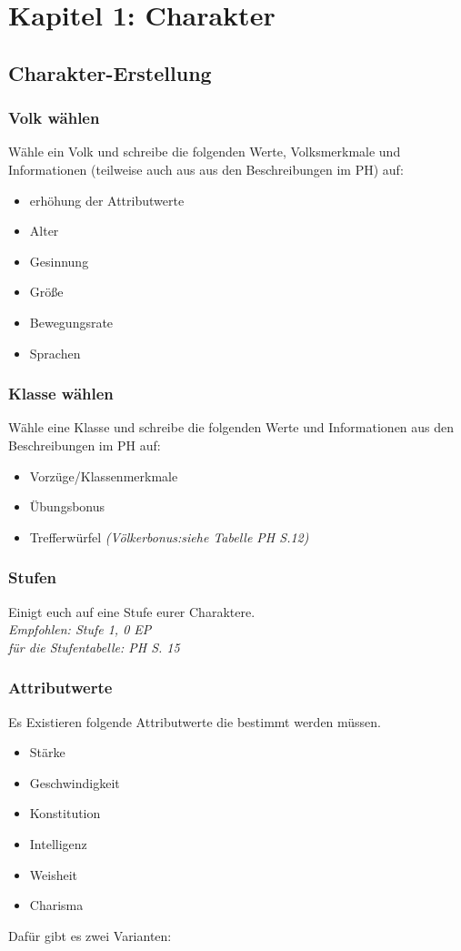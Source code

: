 \chapter{Kapitel 1: Charakter}
\section{Charakter-Erstellung}
\subsection{Volk wählen}
Wähle ein Volk und schreibe die folgenden Werte, Volksmerkmale und Informationen (teilweise auch aus aus den Beschreibungen im PH) auf:
\begin{itemize}
  \item erhöhung der Attributwerte
  \item Alter
  \item Gesinnung
  \item Größe
  \item Bewegungsrate
  \item Sprachen
\end{itemize}

\subsection{Klasse wählen}
Wähle eine Klasse und schreibe die folgenden Werte und Informationen aus den Beschreibungen im PH auf:
\begin{itemize}
  \item Vorzüge/Klassenmerkmale
  \item Übungsbonus
  \item Trefferwürfel
    \subitem \textit{(Völkerbonus:siehe Tabelle PH S.12)}
\end{itemize}

\subsection{Stufen}
Einigt euch auf eine Stufe eurer Charaktere. \\
\textit{Empfohlen: Stufe 1, 0 EP}\\
\textit{für die Stufentabelle: PH S. 15}

\subsection{Attributwerte}
Es Existieren folgende Attributwerte die bestimmt werden müssen.
\begin{itemize}
  \item Stärke
  \item Geschwindigkeit
  \item Konstitution
  \item Intelligenz
  \item Weisheit
  \item Charisma
\end{itemize}
Dafür gibt es zwei Varianten:

